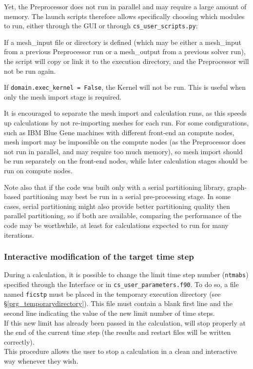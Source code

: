 {{{Yet, the Preprocessor does not run in parallel and may require a
large amount of memory. The launch scripts therefore allows specifically
choosing which modules to run, either through the GUI or through
\texttt{cs\_user\_scripts.py}:

\sloppy

\hspace*{0.5cm} If a {mesh\_input} file or directory is defined (which may be
either a {mesh\_input} from a previous Preprocessor run or a {mesh\_output}
from a previous solver run), the script will copy or link it to
the execution directory, and the Preprocessor will not be run again.

\hspace*{0.5cm} If \texttt{domain.exec\_kernel = False}, the Kernel will not
be run. This is useful when only the mesh import stage is required.

\fussy

It is encouraged to separate the mesh import and calculation runs, as
this speeds up calculations by not re-importing meshes for each run.
For some configurations, such as IBM Blue Gene machines with different
front-end an compute nodes, mesh import may be impossible on the
compute nodes (as the Preprocessor does not run in parallel, and may require
too much memory), so mesh import should be
run separately on the front-end nodes, while later calculation stages
should be run on compute nodes.

Note also that if the code was built only with a serial partitioning library,
graph-based partitioning may best be run in a serial pre-processing stage.
In some cases, serial partitioning might also provide better partitioning
quality then parallel partitioning, so if both are available, comparing
the performance of the code may be worthwhile, at least for calculations
expected to run for many iterations.

\subsubsection{Interactive modification of the target time step}
\label{prg_ficstp}%
During a calculation, it is possible to change the limit time step number
(\texttt{ntmabs}) specified through the Interface or in \texttt{cs\_user\_parameters.f90}.
To do so, a file named \texttt{ficstp} must be placed in the temporary
execution directory (see \S\ref{prg_temporarydirectory}).
This file must contain a blank first line and
the second line indicating the value of the new limit number of time steps.\\
If this new limit has already been passed in the calculation, \CS will stop
properly at the end of the current time step (the results and restart files
will be written correctly).\\
This procedure allows the user to stop a calculation in a clean and interactive
way whenever they wish.


}}}

